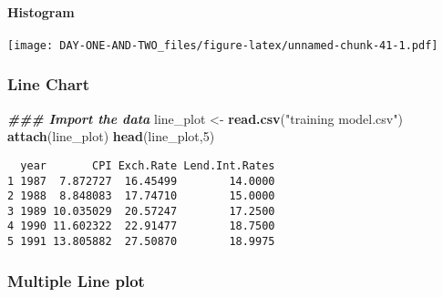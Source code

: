 \documentclass[
]{article}
\newenvironment{Shaded}{\begin{snugshade}}{\end{snugshade}}
\newcommand{\AttributeTok}[1]{\textcolor[rgb]{0.13,0.29,0.53}{#1}}
\newcommand{\DecValTok}[1]{\textcolor[rgb]{0.00,0.00,0.81}{#1}}
\newcommand{\DocumentationTok}[1]{\textcolor[rgb]{0.56,0.35,0.01}{\textbf{\textit{#1}}}}
\newcommand{\FunctionTok}[1]{\textcolor[rgb]{0.13,0.29,0.53}{\textbf{#1}}}
\newcommand{\NormalTok}[1]{#1}
\newcommand{\OtherTok}[1]{\textcolor[rgb]{0.56,0.35,0.01}{#1}}
\newcommand{\SpecialCharTok}[1]{\textcolor[rgb]{0.81,0.36,0.00}{\textbf{#1}}}
\newcommand{\StringTok}[1]{\textcolor[rgb]{0.31,0.60,0.02}{#1}}
\begin{document}
\hypertarget{histogram}{%
\paragraph{Histogram}\label{histogram}}

\begin{Shaded}
\end{Shaded}

\texttt{[image: DAY-ONE-AND-TWO\_files/figure-latex/unnamed-chunk-41-1.pdf]}

\hypertarget{line-chart}{%
\subsubsection{Line Chart}\label{line-chart}}

\begin{Shaded}
\begin{Highlighting}[]
\DocumentationTok{\#\#\# Import the data}
\NormalTok{line\_plot }\OtherTok{\textless{}{-}} \FunctionTok{read.csv}\NormalTok{(}\StringTok{"training model.csv"}\NormalTok{)}
\FunctionTok{attach}\NormalTok{(line\_plot)}
\FunctionTok{head}\NormalTok{(line\_plot,}\DecValTok{5}\NormalTok{)}
\end{Highlighting}
\end{Shaded}

\begin{verbatim}
  year       CPI Exch.Rate Lend.Int.Rates
1 1987  7.872727  16.45499        14.0000
2 1988  8.848083  17.74710        15.0000
3 1989 10.035029  20.57247        17.2500
4 1990 11.602322  22.91477        18.7500
5 1991 13.805882  27.50870        18.9975
\end{verbatim}

\hypertarget{multiple-line-plot}{%
\subsubsection{Multiple Line plot}\label{multiple-line-plot}}
\end{document}
